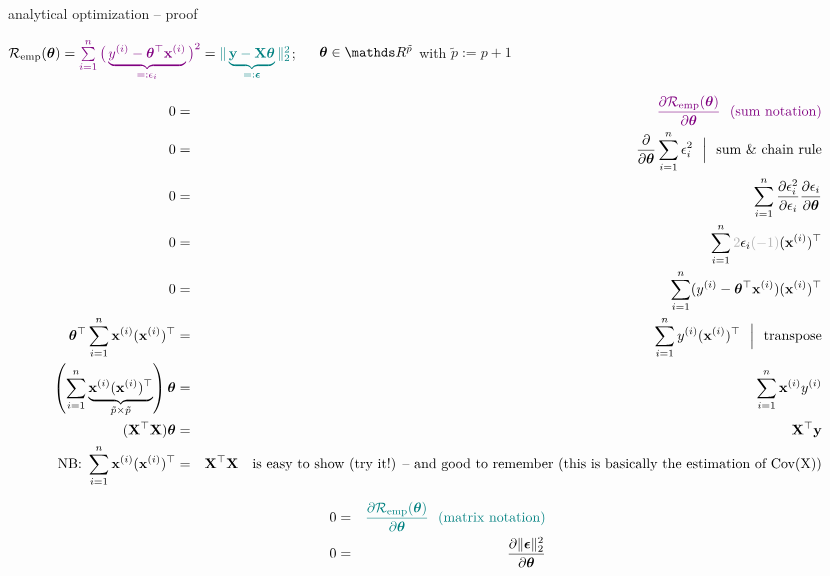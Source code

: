 \documentclass[11pt,compress,t,notes=noshow, xcolor=table]{beamer}
\begin{document}
\begin{vbframe}{analytical optimization -- proof}

\scriptsize
$\mathcal{R}_{\text{emp}}(\bm{\theta}) = \textcolor{violet}{\sum\limits_{i=1}^n \big(\underbrace{y^{(i)} - \bm{\theta}^\top \mathbf{x}^{(i)}}_{=:
\epsilon_i} \big)^2}
= \textcolor{teal}{\| \underbrace{\mathbf{y} - \mathbf{X} \bm{\theta}}_{=: \bm{\epsilon}} 
\|^2_2}$; ~~ $\thetav \in \R^{\tilde p}$ with $\tilde p := p + 1$


\begin{minipage}[t]{0.52\textwidth}
    \tiny 
    \begin{eqnarray*}
        0 &=& \textcolor{violet}{\frac{\partial \risket}{\partial \thetav}
        ~~ \text{(sum notation)}} \\
        0 &=& \frac{\partial}{\partial \thetav} \sumin \epsilon_i^2 
        ~~ \Big \rvert
        ~~ \text{sum \& chain rule} \\
        0 &=& \sumin \frac{\partial \epsilon_i^2}{\partial \epsilon_i}
        \frac{\partial \epsilon_i}{\partial \thetav} \\
        0 &=& \sumin \textcolor{black!30}{2} \epsilon_i 
        \textcolor{black!30}{(-1)} (\xi)^\top \\ 
        0 &=& \sumin (\yi - \thetav^\top \xi)(\xi)^\top \\
        \thetav^\top \sumin  \xi (\xi)^\top &=&\sumin \yi (\xi)^\top 
        ~~ \Big \rvert ~~ \text{transpose} \\
        \left( \sumin \underbrace{\xi (\xi)^\top }_{\tilde p \times \tilde p}\right) \thetav &=& 
        \sumin \xi \yi \\
        (\Xmat^\top \Xmat) \thetav &=&  \Xmat^\top \yv \\
        \text{NB: } \sumin \xi (\xi)^\top &=& \Xmat^\top \Xmat \quad \text{is easy to show (try it!) -- and good to remember (this is basically the estimation of Cov(X))}
    \end{eqnarray*}
\end{minipage}
\hfill
\begin{minipage}[t]{0.45\textwidth}
    \tiny 
    \begin{eqnarray*}
        0 &=& \textcolor{teal}{\frac{\partial \risket}{\partial \thetav}
        ~~ \text{(matrix notation)}} \\
        0 &=& \frac{\partial \| \bm{\epsilon} \|_2^2 }{\partial \thetav} \\

\end{eqnarray*}
\end{minipage}
\end{vbframe}
\end{document}
